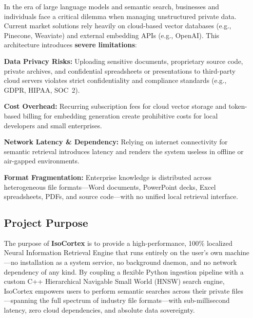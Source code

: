 \documentclass[12pt, a4paper]{article}
\begin{document}
In the era of large language models and semantic search, businesses and
individuals face a critical dilemma when managing unstructured private data.
Current market solutions rely heavily on cloud-based vector databases
(e.g., Pinecone, Weaviate) and external embedding APIs (e.g., OpenAI).
This architecture introduces \textbf{severe limitations}:

\begin{tcolorbox}[standardbox, colback=white, colframe=ctPurple, leftrule=3pt]
\begin{prolist}
    \item \textbf{\textcolor{ctGold}{Data Privacy Risks:}} Uploading sensitive
    documents, proprietary source code, private archives, and confidential
    spreadsheets or presentations to third-party cloud servers violates strict
    confidentiality and compliance standards (e.g., GDPR, HIPAA, SOC~2).

    \item \textbf{\textcolor{ctGold}{Cost Overhead:}} Recurring subscription
    fees for cloud vector storage and token-based billing for embedding
    generation create prohibitive costs for local developers and small
    enterprises.

    \item \textbf{\textcolor{ctGold}{Network Latency \& Dependency:}} Relying
    on internet connectivity for semantic retrieval introduces latency and
    renders the system useless in offline or air-gapped environments.

    \item \textbf{\textcolor{ctGold}{Format Fragmentation:}} Enterprise
    knowledge is distributed across heterogeneous file formats---Word
    documents, PowerPoint decks, Excel spreadsheets, PDFs, and source
    code---with no unified local retrieval interface.
\end{prolist}
\end{tcolorbox}

\subsection{Project Purpose}

The purpose of \textbf{IsoCortex} is to provide a high-performance, 100\%
localized Neural Information Retrieval Engine that runs entirely on the
user's own machine---no installation as a system service, no background
daemon, and no network dependency of any kind. By coupling a flexible
Python ingestion pipeline with a custom C++ Hierarchical Navigable Small
World (HNSW) search engine, IsoCortex empowers users to perform semantic
searches across their private files---spanning the full spectrum of industry
file formats---with sub-millisecond latency, zero cloud dependencies, and
absolute data sovereignty.
\end{document}
